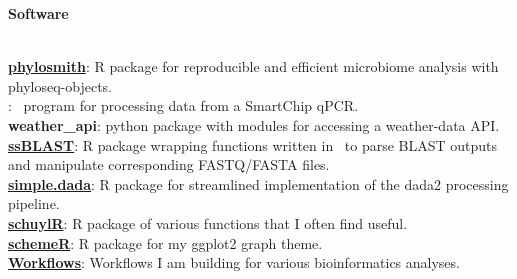 \vspace{0.4cm}
{\Large \textbf{Software}}\\[-0.4cm]
\makebox[\linewidth]{\rule{1.0\textwidth}{0.4pt}}\\
\vspace{0cm}

\begin{addmargin}[0.5cm]{0cm}
\tab[-0.5cm] \href{https://schuyler-smith.github.io/phylosmith/}{\textbf{phylosmith}}: \textsf{R} package for reproducible and efficient microbiome analysis with phyloseq-objects. \\
: \CC\ program for processing data from a SmartChip qPCR. \\
\tab[-0.5cm] \textbf{weather\_api}: {\FluxR python} package with modules for accessing a weather-data API. \\
\tab[-0.5cm] \href{https://github.com/schuyler-smith/ssBLAST}{\textbf{ssBLAST}}: \textsf{R} package wrapping functions written in \CC\ to parse BLAST outputs and manipulate corresponding FASTQ/FASTA files. \\
\tab[-0.5cm] \href{https://github.com/schuyler-smith/simple.dada}{\textbf{simple.dada}}: \textsf{R} package for streamlined implementation of the dada2 processing pipeline. \\
\tab[-0.5cm] \href{https://github.com/schuyler-smith/schuylR}{\textbf{schuylR}}: \textsf{R} package of various functions that I often find useful. \\
\tab[-0.5cm] \href{https://github.com/schuyler-smith/schemeR}{\textbf{schemeR}}: \textsf{R} package for my ggplot2 graph theme. \\
\tab[-0.5cm] \href{https://github.com/schuyler-smith/nf}{\textbf{Workflows}}: Workflows I am building for various bioinformatics analyses. \\

\end{addmargin}
